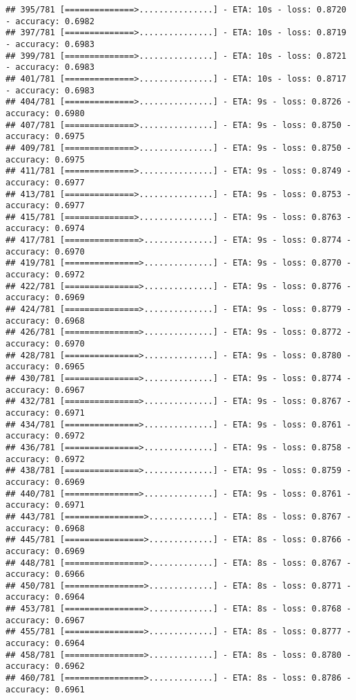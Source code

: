 \documentclass[
]{article}
\begin{document}
\begin{verbatim}
## 395/781 [==============>...............] - ETA: 10s - loss: 0.8720 - accuracy: 0.6982
## 397/781 [==============>...............] - ETA: 10s - loss: 0.8719 - accuracy: 0.6983
## 399/781 [==============>...............] - ETA: 10s - loss: 0.8721 - accuracy: 0.6983
## 401/781 [==============>...............] - ETA: 10s - loss: 0.8717 - accuracy: 0.6983
## 404/781 [==============>...............] - ETA: 9s - loss: 0.8726 - accuracy: 0.6980 
## 407/781 [==============>...............] - ETA: 9s - loss: 0.8750 - accuracy: 0.6975
## 409/781 [==============>...............] - ETA: 9s - loss: 0.8750 - accuracy: 0.6975
## 411/781 [==============>...............] - ETA: 9s - loss: 0.8749 - accuracy: 0.6977
## 413/781 [==============>...............] - ETA: 9s - loss: 0.8753 - accuracy: 0.6977
## 415/781 [==============>...............] - ETA: 9s - loss: 0.8763 - accuracy: 0.6974
## 417/781 [===============>..............] - ETA: 9s - loss: 0.8774 - accuracy: 0.6970
## 419/781 [===============>..............] - ETA: 9s - loss: 0.8770 - accuracy: 0.6972
## 422/781 [===============>..............] - ETA: 9s - loss: 0.8776 - accuracy: 0.6969
## 424/781 [===============>..............] - ETA: 9s - loss: 0.8779 - accuracy: 0.6968
## 426/781 [===============>..............] - ETA: 9s - loss: 0.8772 - accuracy: 0.6970
## 428/781 [===============>..............] - ETA: 9s - loss: 0.8780 - accuracy: 0.6965
## 430/781 [===============>..............] - ETA: 9s - loss: 0.8774 - accuracy: 0.6967
## 432/781 [===============>..............] - ETA: 9s - loss: 0.8767 - accuracy: 0.6971
## 434/781 [===============>..............] - ETA: 9s - loss: 0.8761 - accuracy: 0.6972
## 436/781 [===============>..............] - ETA: 9s - loss: 0.8758 - accuracy: 0.6972
## 438/781 [===============>..............] - ETA: 9s - loss: 0.8759 - accuracy: 0.6969
## 440/781 [===============>..............] - ETA: 9s - loss: 0.8761 - accuracy: 0.6971
## 443/781 [================>.............] - ETA: 8s - loss: 0.8767 - accuracy: 0.6968
## 445/781 [================>.............] - ETA: 8s - loss: 0.8766 - accuracy: 0.6969
## 448/781 [================>.............] - ETA: 8s - loss: 0.8767 - accuracy: 0.6966
## 450/781 [================>.............] - ETA: 8s - loss: 0.8771 - accuracy: 0.6964
## 453/781 [================>.............] - ETA: 8s - loss: 0.8768 - accuracy: 0.6967
## 455/781 [================>.............] - ETA: 8s - loss: 0.8777 - accuracy: 0.6964
## 458/781 [================>.............] - ETA: 8s - loss: 0.8780 - accuracy: 0.6962
## 460/781 [================>.............] - ETA: 8s - loss: 0.8786 - accuracy: 0.6961

\end{verbatim}
\end{document}
